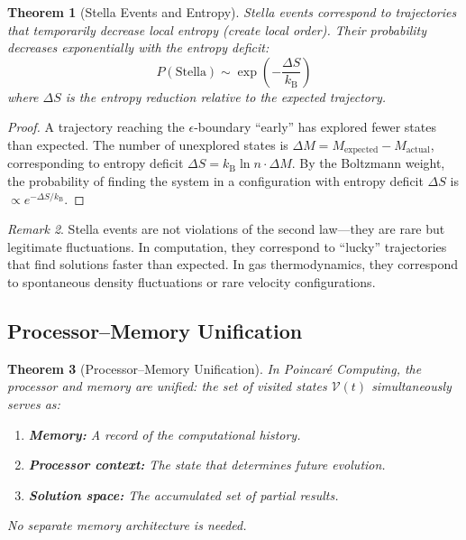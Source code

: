 \documentclass[twocolumn,10pt,a4paper]{article}
\theoremstyle{plain}
\newtheorem{theorem}{Theorem}[section]
\theoremstyle{definition}
\theoremstyle{remark}
\newtheorem{remark}[theorem]{Remark}
\newcommand{\kB}{k_{\mathrm{B}}}
\begin{document}
\begin{theorem}[Stella Events and Entropy]
\label{thm:stella}
Stella events correspond to trajectories that temporarily decrease local entropy (create local order). Their probability decreases exponentially with the entropy deficit:
\begin{equation}
    P(\text{Stella}) \sim \exp\!\left(-\frac{\Delta S}{\kB}\right)
\end{equation}
where $\Delta S$ is the entropy reduction relative to the expected trajectory.
\end{theorem}

\begin{proof}
A trajectory reaching the $\epsilon$-boundary ``early'' has explored fewer states than expected. The number of unexplored states is $\Delta M = M_{\mathrm{expected}} - M_{\mathrm{actual}}$, corresponding to entropy deficit $\Delta S = \kB \ln n \cdot \Delta M$. By the Boltzmann weight, the probability of finding the system in a configuration with entropy deficit $\Delta S$ is $\propto e^{-\Delta S/\kB}$.
\end{proof}

\begin{remark}
Stella events are not violations of the second law---they are rare but legitimate fluctuations. In computation, they correspond to ``lucky'' trajectories that find solutions faster than expected. In gas thermodynamics, they correspond to spontaneous density fluctuations or rare velocity configurations.
\end{remark}

\subsection{Processor--Memory Unification}

\begin{theorem}[Processor--Memory Unification]
\label{thm:proc_mem}
In Poincar\'{e} Computing, the processor and memory are unified: the set of visited states $\mathcal{V}(t)$ simultaneously serves as:
\begin{enumerate}
    \item \textbf{Memory:} A record of the computational history.
    \item \textbf{Processor context:} The state that determines future evolution.
    \item \textbf{Solution space:} The accumulated set of partial results.
\end{enumerate}
No separate memory architecture is needed.
\end{theorem}
\end{document}
